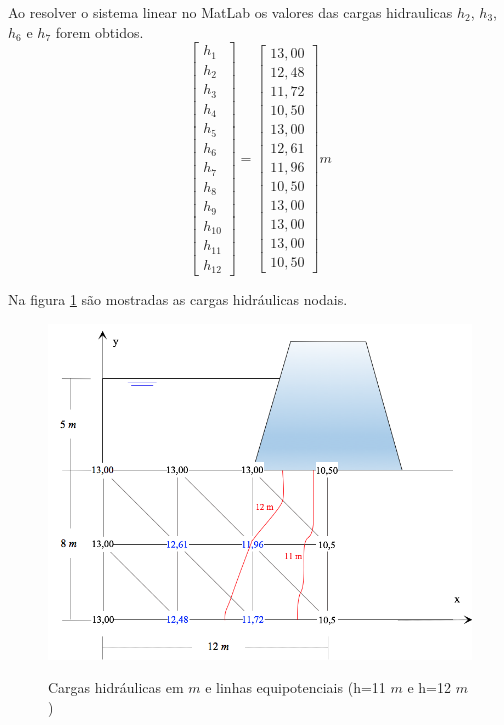 \documentclass{article} %
\begin{document}
Ao resolver o sistema linear no MatLab os valores das cargas hidraulicas \(h_2\), \(h_3\), \(h_6\) e \(h_7\) forem obtidos.
\begin{equation}
\begin{bmatrix}
h_1\\h_2\\h_3\\h_4\\h_5\\h_6\\h_7\\h_8\\h_9\\h_{10}\\h_{11}\\h_{12}
\end{bmatrix}=\begin{bmatrix}
13,00\\12,48\\11,72\\10,50\\13,00\\12,61\\11,96\\10,50\\13,00\\13,00\\13,00\\10,50
\end{bmatrix}m
\end{equation}

Na figura \ref{result} são mostradas as cargas hidráulicas nodais.
\begin{figure}[H]
	\centering
	\caption{Cargas hidráulicas em \(m\) e linhas equipotenciais (h=11 \(m\) e h=12 \(m\))}
	\includegraphics[width=0.75\linewidth]{result}	
	\label{result}	
\end{figure}
\end{document}
